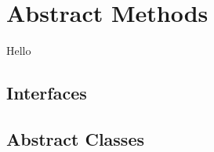 \chapter{Abstract Methods}

Hello

\section{Interfaces}
\csharpsubsection{\csharp}





\section{Abstract Classes}
\csharpsubsection{\csharp}

